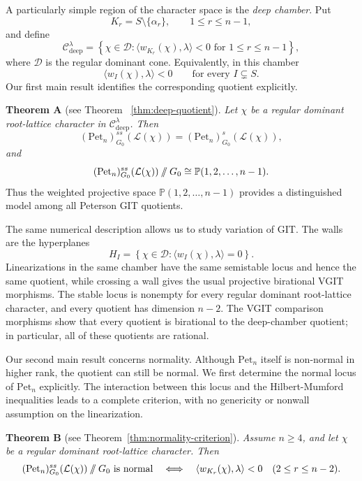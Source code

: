 \documentclass[12pt, reqno]{amsart}
\newcommand{\sslash}{\mathbin{/\mkern-6mu/}}
\theoremstyle{plain}
\numberwithin{equation}{section}
\theoremstyle{definition}
\begin{document}
A particularly simple region of the character space is the
\emph{deep chamber}. Put
\[
K_r=S\setminus\{\alpha_r\},
\qquad 1\le r\le n-1,
\]
and define
\[
\mathcal C^\lambda_{\mathrm{deep}}
=
\left\{
\chi\in\mathcal D:
\langle w_{K_r}(\chi),\lambda\rangle<0
\text{ for }1\le r\le n-1
\right\},
\]
where \(\mathcal D\) is the regular dominant cone. Equivalently, in
this chamber
\[
\langle w_I(\chi),\lambda\rangle<0
\qquad
\text{for every }I\subsetneq S.
\]
Our first main result identifies the corresponding quotient
explicitly.

\medskip
\noindent\textbf{Theorem A} (see Theorem~ \ref{thm:deep-quotient}).
\emph{Let \(\chi\) be a regular dominant root-lattice character in
\(\mathcal C^\lambda_{\mathrm{deep}}\). Then
\[
(\mathrm{Pet}_n)^{ss}_{G_0}(\mathcal L(\chi))
=
(\mathrm{Pet}_n)^s_{G_0}(\mathcal L(\chi)),
\]
and
\[
(\mathrm{Pet}_n)^{ss}_{G_0}(\mathcal L(\chi))
\sslash G_0
\cong
\mathbb P(1,2,\ldots,n-1).
\]}
Thus the weighted projective
space \(\mathbb P(1,2,\ldots,n-1)\) provides a distinguished model
among all Peterson GIT quotients.

The same numerical description allows us to study variation of GIT.
The walls are the hyperplanes
\[
H_I
=
\left\{
\chi\in\mathcal D:
\langle w_I(\chi),\lambda\rangle=0
\right\}.
\]
Linearizations in the same chamber have the same semistable locus and
hence the same quotient, while crossing a wall gives the usual
projective birational VGIT morphisms. The stable locus is nonempty for every regular dominant
root-lattice character, and every quotient has dimension \(n-2\).
The VGIT comparison morphisms show that every quotient is birational to the deep-chamber quotient; in particular,
all of these quotients are rational. 

Our second main result concerns normality. Although
\(\mathrm{Pet}_n\) itself is non-normal in higher rank, the quotient
can still be normal. We first determine the normal locus of
\(\mathrm{Pet}_n\) explicitly. The interaction between this locus and the Hilbert-Mumford
inequalities leads to a complete criterion, with no genericity or
nonwall assumption on the linearization.

\noindent\textbf{Theorem B} (see Theorem~\ref{thm:normality-criterion}). 
\emph{Assume \(n\ge4\), and let \(\chi\) be a regular dominant
root-lattice character. Then
\[
(\mathrm{Pet}_n)^{ss}_{G_0}(\mathcal L(\chi))
\sslash G_0
\text{ is normal}
\quad\Longleftrightarrow\quad
\langle w_{K_r}(\chi),\lambda\rangle<0
\quad
(2\le r\le n-2).
\]}
\end{document}
